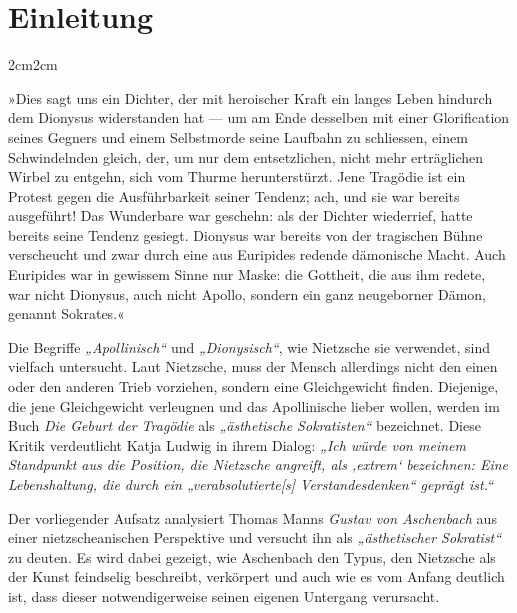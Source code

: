\documentclass[12pt,a4paper]{article}
\newenvironment{longquote}
{%
    \vspace{-1.5em}
    \begin{adjustwidth}{2cm}{2cm}
        \fontsize{10}{12}\selectfont
        \singlespacing
        \itshape
    }
{%
    \end{adjustwidth}
}
\begin{document}
\clearpage


\onehalfspacing
\setlength{\parskip}{0.5\baselineskip}

\section{Einleitung}
\begin{longquote}
    »Dies sagt uns ein Dichter, der mit heroischer Kraft ein langes Leben hindurch dem Dionysus widerstanden hat — um am Ende desselben mit einer Glorification seines Gegners und einem Selbstmorde seine Laufbahn zu schliessen, einem Schwindelnden gleich, der, um nur dem entsetzlichen, nicht mehr erträglichen Wirbel zu entgehn, sich vom Thurme herunterstürzt. Jene Tragödie ist ein Protest gegen die Ausführbarkeit seiner Tendenz; ach, und sie war bereits ausgeführt! Das Wunderbare war geschehn: als der Dichter wiederrief, hatte bereits seine Tendenz gesiegt. Dionysus war bereits von der tragischen Bühne verscheucht und zwar durch eine aus Euripides redende dämonische Macht. Auch Euripides war in gewissem Sinne nur Maske: die Gottheit, die aus ihm redete, war nicht Dionysus, auch nicht Apollo, sondern ein ganz neugeborner Dämon, genannt Sokrates.«\autocite[84–85]{nietzsche1920}
\end{longquote}

Die Begriffe \textit{„Apollinisch“} und \textit{„Dionysisch“}, wie Nietzsche sie verwendet, sind vielfach untersucht. Laut Nietzsche, muss der Mensch allerdings nicht den einen oder den anderen Trieb vorziehen, sondern eine Gleichgewicht finden. Diejenige, die jene Gleichgewicht verleugnen und das Apollinische lieber wollen, werden im Buch \textit{Die Geburt der Tragödie} als \textit{„ästhetische Sokratisten“\autocite[87]{nietzsche1920}} bezeichnet. Diese Kritik verdeutlicht Katja Ludwig in ihrem Dialog: \textit{„Ich würde von meinem Standpunkt aus die Position, die Nietzsche angreift, als ‚extrem‘ bezeichnen: Eine Lebenshaltung, die durch ein „verabsolutierte[s] Verstandesdenken“ geprägt ist.“}\autocite[10]{ludwig}\par

Der vorliegender Aufsatz analysiert Thomas Manns \textit{Gustav von Aschenbach} aus einer nietzscheanischen Perspektive und versucht ihn als \textit{„ästhetischer Sokratist“} zu deuten. Es wird dabei gezeigt, wie Aschenbach den Typus, den Nietzsche als der Kunst feindselig beschreibt, verkörpert und auch wie es vom Anfang deutlich ist, dass dieser notwendigerweise seinen eigenen Untergang verursacht. 
\end{document}
